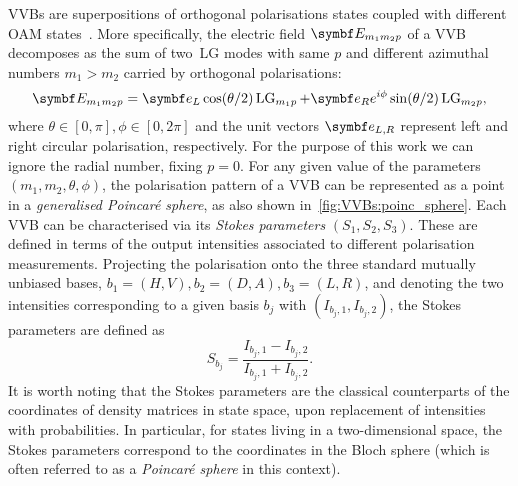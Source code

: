 \acfp{VVB} are superpositions of orthogonal polarisations states coupled with different \ac{OAM} states~\cite{padgett2004lights}.
More specifically, the electric field $\bs{E}_{m_1m_2p}$ of a \ac{VVB} decomposes as the sum of two~\ac{LG} modes with same $p$ and different azimuthal numbers $m_1>m_2$ carried by orthogonal polarisations:
\begin{equation}
	\bs{E}_{m_1m_2p} =
	\bs{e}_L \cos(\theta/2)\on{LG}_{m_1p} +
	\bs{e}_R e^{i \phi} \sin(\theta/2)\on{LG}_{m_2p},
\end{equation}
where $\theta\in[0,\pi], \phi\in[0,2\pi]$ and the unit vectors $\bs{e}_{L,R}$ represent left and right circular polarisation, respectively.
For the purpose of this work we can ignore the radial number, fixing $p=0$.
For any given value of the parameters $(m_1, m_2, \theta, \phi)$, the polarisation pattern of a \ac{VVB} can be represented as a point in a \emph{generalised Poincar\'e sphere}, as also shown in~\cref{fig:VVBs:poinc_sphere}.
Each VVB can be characterised via its \emph{Stokes parameters} $(S_1,S_2,S_3)$.
These are defined in terms of the output intensities associated to different polarisation measurements.
Projecting the polarisation onto the three standard mutually unbiased bases, $b_1=(H,V), b_2=(D,A), b_3=(L,R)$, and denoting the two intensities corresponding to a given basis $b_j$ with $(I_{b_j,1},I_{b_j,2})$, the Stokes parameters are defined as
\begin{equation}
	S_{b_j} = \frac{I_{b_j,1}-I_{b_j,2}}{I_{b_j,1}+I_{b_j,2}}.
\end{equation}
It is worth noting that the Stokes parameters are the classical counterparts of the coordinates of density matrices in state space, upon replacement of intensities with probabilities.
In particular, for states living in a two-dimensional space, the Stokes parameters correspond to the coordinates in the Bloch sphere (which is often referred to as a \emph{Poincaré sphere} in this context).

